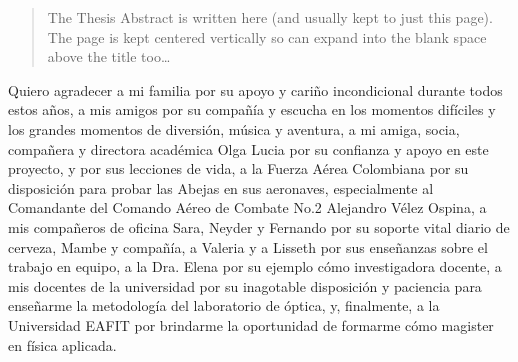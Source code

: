 \documentclass[
12pt, %
english, %
singlespacing, %
headsepline, %
]{MastersDoctoralThesis} %
\begin{document}


\begin{abstract}
\addchaptertocentry{\abstractname} %
The Thesis Abstract is written here (and usually kept to just this page). The page is kept centered vertically so can expand into the blank space above the title too\ldots
\end{abstract}


\begin{acknowledgements}
\addchaptertocentry{\acknowledgementname} %
Quiero agradecer a mi familia por su apoyo y cariño incondicional durante todos estos años, a mis amigos por su compañía y escucha en los momentos difíciles y los grandes momentos de diversión, música y aventura, a mi amiga, socia, compañera y directora académica Olga Lucia por su confianza y apoyo en este proyecto, y por sus lecciones de vida, a la Fuerza Aérea Colombiana por su disposición para probar las Abejas en sus aeronaves, especialmente al Comandante del Comando Aéreo de Combate No.2 Alejandro Vélez Ospina, a mis compañeros de oficina Sara, Neyder y Fernando por su soporte vital diario de cerveza, Mambe y compañía, a Valeria y a Lisseth por sus enseñanzas sobre el trabajo en equipo, a la Dra. Elena por su ejemplo cómo investigadora docente, a mis docentes de la universidad por su inagotable disposición y paciencia para enseñarme la metodología del laboratorio de óptica, y, finalmente, a la Universidad EAFIT por brindarme la oportunidad de formarme cómo magister en física aplicada.  
\end{acknowledgements}


\tableofcontents %
\end{document}
